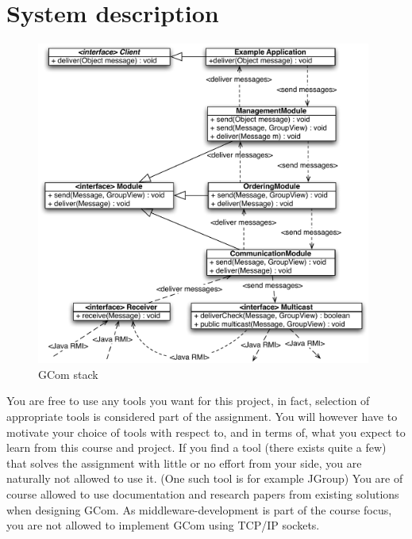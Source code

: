 \documentclass[titlepage, twocolumn, a4paper, 10pt]{article}
\begin{document}
\section{System description}\label{sec:system}



\begin{figure}[!t]
  \centerline{\includegraphics[width=110mm]{images/Stack.pdf}}
  \caption{GCom stack}
  \label{fig:images/Stack}
\end{figure}

You are free to use any tools you want for this project, in fact, selection of appropriate tools is considered part of the assignment. You will however have to motivate your choice of tools with respect to, and in terms of, what you expect to learn from this course and project. If you find a tool (there exists quite a few) that solves the assignment with little or no effort from your side, you are naturally not allowed to use it. (One such tool is for example JGroup) You are of course allowed to use documentation and research papers from existing solutions when designing GCom. As middleware-development is part of the course focus, you are not allowed to implement GCom using TCP/IP sockets.
\end{document}
